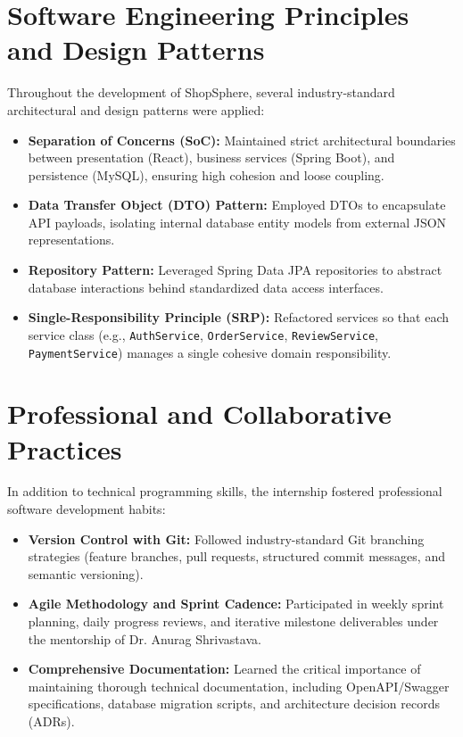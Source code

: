 \section{Software Engineering Principles and Design Patterns}
Throughout the development of ShopSphere, several industry-standard architectural and design patterns were applied:
\begin{itemize}[leftmargin=2.0em]
    \item \textbf{Separation of Concerns (SoC):} Maintained strict architectural boundaries between presentation (React), business services (Spring Boot), and persistence (MySQL), ensuring high cohesion and loose coupling.
    \item \textbf{Data Transfer Object (DTO) Pattern:} Employed DTOs to encapsulate API payloads, isolating internal database entity models from external JSON representations.
    \item \textbf{Repository Pattern:} Leveraged Spring Data JPA repositories to abstract database interactions behind standardized data access interfaces.
    \item \textbf{Single-Responsibility Principle (SRP):} Refactored services so that each service class (e.g., \texttt{AuthService}, \texttt{OrderService}, \texttt{ReviewService}, \texttt{PaymentService}) manages a single cohesive domain responsibility.
\end{itemize}

\section{Professional and Collaborative Practices}
In addition to technical programming skills, the internship fostered professional software development habits:
\begin{itemize}[leftmargin=2.0em]
    \item \textbf{Version Control with Git:} Followed industry-standard Git branching strategies (feature branches, pull requests, structured commit messages, and semantic versioning).
    \item \textbf{Agile Methodology and Sprint Cadence:} Participated in weekly sprint planning, daily progress reviews, and iterative milestone deliverables under the mentorship of Dr. Anurag Shrivastava.
    \item \textbf{Comprehensive Documentation:} Learned the critical importance of maintaining thorough technical documentation, including OpenAPI/Swagger specifications, database migration scripts, and architecture decision records (ADRs).
\end{itemize}

